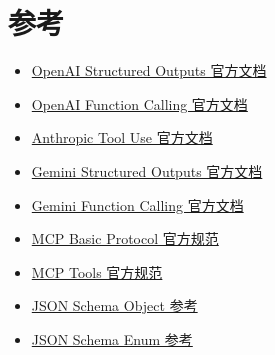 \documentclass[9pt,a4paper,twocolumn]{ctexart}
\begin{document}
\section*{参考}

\begin{itemize}[itemsep=1pt, topsep=2pt]
  \item \href{https://platform.openai.com/docs/guides/structured-outputs}{OpenAI Structured Outputs 官方文档}
  \item \href{https://platform.openai.com/docs/guides/function-calling}{OpenAI Function Calling 官方文档}
  \item \href{https://platform.claude.com/docs/en/agents-and-tools/tool-use/overview}{Anthropic Tool Use 官方文档}
  \item \href{https://ai.google.dev/gemini-api/docs/structured-output}{Gemini Structured Outputs 官方文档}
  \item \href{https://ai.google.dev/gemini-api/docs/function-calling}{Gemini Function Calling 官方文档}
  \item \href{https://modelcontextprotocol.io/specification/2025-06-18/basic}{MCP Basic Protocol 官方规范}
  \item \href{https://modelcontextprotocol.io/specification/2025-06-18/server/tools}{MCP Tools 官方规范}
  \item \href{https://json-schema.org/understanding-json-schema/reference/object}{JSON Schema Object 参考}
  \item \href{https://json-schema.org/understanding-json-schema/reference/enum}{JSON Schema Enum 参考}
\end{itemize}
\end{document}
